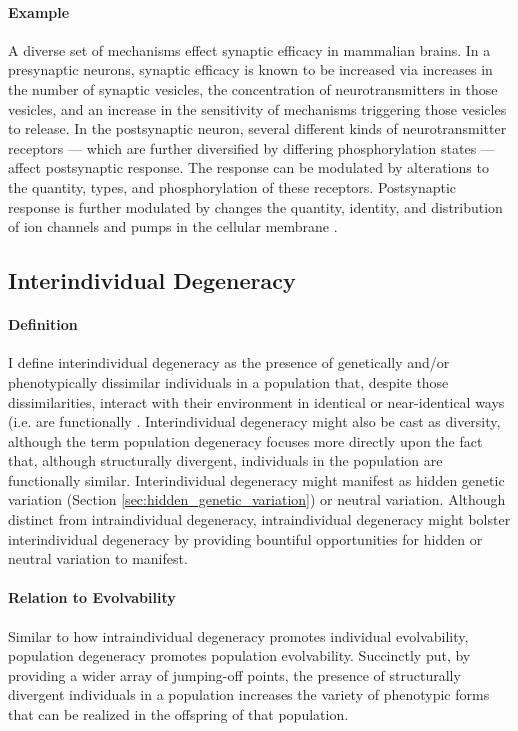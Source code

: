\paragraph{Example}
A diverse set of mechanisms effect synaptic efficacy in mammalian brains. In a presynaptic neurons, synaptic efficacy is known to be increased via increases in the number of synaptic vesicles, the concentration of neurotransmitters in those vesicles, and an increase in the sensitivity of mechanisms triggering those vesicles to release. In the postsynaptic neuron, several different kinds of neurotransmitter receptors --- which are further diversified by differing phosphorylation states --- affect postsynaptic response. The response can be modulated by alterations to the quantity, types, and phosphorylation of these receptors. Postsynaptic response is further modulated by changes the quantity, identity, and distribution of ion channels and pumps in the cellular membrane \cite{Edelman2001DegeneracySystems}. 

\subsection{Interindividual Degeneracy}

\paragraph{Definition}

I define interindividual degeneracy as the presence of genetically and/or phenotypically dissimilar individuals in a population that, despite those dissimilarities, interact with their environment in identical or near-identical ways (i.e. are functionally . Interindividual degeneracy might also be cast as diversity, although the term population degeneracy focuses more directly upon the fact that, although structurally divergent, individuals in the population are functionally similar. Interindividual degeneracy might manifest as hidden genetic variation (Section \ref{sec:hidden_genetic_variation}) or neutral variation. Although distinct from intraindividual degeneracy, intraindividual degeneracy might bolster interindividual degeneracy by providing bountiful opportunities for hidden or neutral variation to manifest.  \mindmapmark{\interindividualdegeneracyintraindividualdegeneracy}


\paragraph{Relation to Evolvability}
Similar to how intraindividual degeneracy promotes individual evolvability, population degeneracy promotes population evolvability. Succinctly put, by providing a wider array of jumping-off points, the presence of structurally divergent individuals in a population increases the variety of phenotypic forms that can be realized in the offspring of that population.
\mindmapmark{\populationevolvabilityinterindividualdegeneracy}

